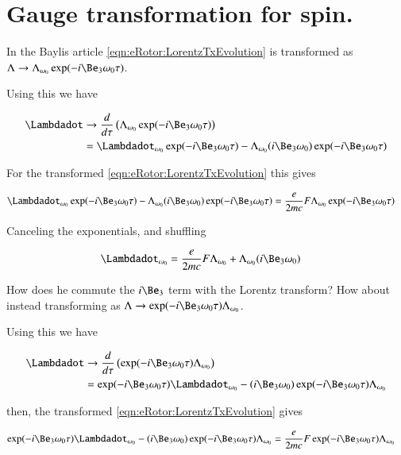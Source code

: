 \section{Gauge transformation for spin. }

In the Baylis article \ref{eqn:eRotor:LorentzTxEvolution} is transformed as
$\Lambda \rightarrow \Lambda_{\omega_0} \exp( -i \Be_3 \omega_0 \tau)$.

Using this we have

\begin{align*}
\Lambdadot 
&\rightarrow \frac{d}{d\tau}\left(\Lambda_{\omega_0} \exp( -i \Be_3 \omega_0 \tau) \right) \\
&= \Lambdadot_{\omega_0} \exp( -i \Be_3 \omega_0 \tau) 
- \Lambda_{\omega_0} ( i \Be_3 \omega_0 ) \exp( -i \Be_3 \omega_0 \tau) 
\end{align*}

For the transformed \ref{eqn:eRotor:LorentzTxEvolution} this gives

\begin{align*}
\Lambdadot_{\omega_0} \exp( -i \Be_3 \omega_0 \tau) 
- \Lambda_{\omega_0} ( i \Be_3 \omega_0 ) \exp( -i \Be_3 \omega_0 \tau) 
&= \frac{e}{2 m c} F \Lambda_{\omega_0} \exp( -i \Be_3 \omega_0 \tau)
\end{align*}

Canceling the exponentials, and shuffling

\begin{align}\label{eqn:eRotor:firstTry}
\Lambdadot_{\omega_0} &= \frac{e}{2 m c} F \Lambda_{\omega_0} + \Lambda_{\omega_0} ( i \Be_3 \omega_0 ) 
\end{align}

How does he commute the $i\Be_3$ term with the Lorentz transform?  How about instead 
transforming as
$\Lambda \rightarrow \exp( -i \Be_3 \omega_0 \tau) \Lambda_{\omega_0}$.

Using this we have

\begin{align*}
\Lambdadot 
&\rightarrow \frac{d}{d\tau}\left(
\exp( -i \Be_3 \omega_0 \tau) 
\Lambda_{\omega_0} 
\right) \\
&= 
\exp( -i \Be_3 \omega_0 \tau) 
\Lambdadot_{\omega_0} 
- 
( i \Be_3 \omega_0 ) \exp( -i \Be_3 \omega_0 \tau) 
\Lambda_{\omega_0} 
\end{align*}

then, the transformed \ref{eqn:eRotor:LorentzTxEvolution} gives

\begin{align*}
\exp( -i \Be_3 \omega_0 \tau) 
\Lambdadot_{\omega_0} 
- 
( i \Be_3 \omega_0 ) \exp( -i \Be_3 \omega_0 \tau) 
\Lambda_{\omega_0} 
&= \frac{e}{2 m c} F 
\exp( -i \Be_3 \omega_0 \tau)
\Lambda_{\omega_0} 
\end{align*}

